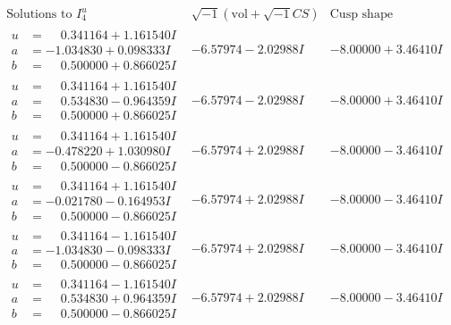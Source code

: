 \documentclass[1p]{elsarticle_modified}
\theoremstyle{definition}
\newcommand{\I}{\sqrt{-1}}
\begin{document}
$$\begin{array}{c|c|c}  
\text{Solutions to }I^u_{4}& \I (\text{vol} + \sqrt{-1}CS) & \text{Cusp shape}\\
 \hline 
\begin{aligned}
u &= \phantom{-}0.341164 + 1.161540 I \\
a &= -1.034830 + 0.098333 I \\
b &= \phantom{-}0.500000 + 0.866025 I\end{aligned}
 & -6.57974 - 2.02988 I & -8.00000 + 3.46410 I \\ \hline\begin{aligned}
u &= \phantom{-}0.341164 + 1.161540 I \\
a &= \phantom{-}0.534830 - 0.964359 I \\
b &= \phantom{-}0.500000 + 0.866025 I\end{aligned}
 & -6.57974 - 2.02988 I & -8.00000 + 3.46410 I \\ \hline\begin{aligned}
u &= \phantom{-}0.341164 + 1.161540 I \\
a &= -0.478220 + 1.030980 I \\
b &= \phantom{-}0.500000 - 0.866025 I\end{aligned}
 & -6.57974 + 2.02988 I & -8.00000 - 3.46410 I \\ \hline\begin{aligned}
u &= \phantom{-}0.341164 + 1.161540 I \\
a &= -0.021780 - 0.164953 I \\
b &= \phantom{-}0.500000 - 0.866025 I\end{aligned}
 & -6.57974 + 2.02988 I & -8.00000 - 3.46410 I \\ \hline\begin{aligned}
u &= \phantom{-}0.341164 - 1.161540 I \\
a &= -1.034830 - 0.098333 I \\
b &= \phantom{-}0.500000 - 0.866025 I\end{aligned}
 & -6.57974 + 2.02988 I & -8.00000 - 3.46410 I \\ \hline\begin{aligned}
u &= \phantom{-}0.341164 - 1.161540 I \\
a &= \phantom{-}0.534830 + 0.964359 I \\
b &= \phantom{-}0.500000 - 0.866025 I\end{aligned}
 & -6.57974 + 2.02988 I & -8.00000 - 3.46410 I \\ \hline\begin{aligned}

\end{aligned}
\end{array}$$
\end{document}
